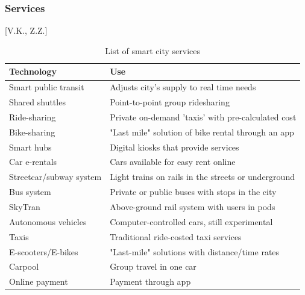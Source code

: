 \documentclass[12pt]{article}                       %
\begin{document}
\subsubsection{Services}[V.K., Z.Z.] \label{sec:smart_city_services}
\begin{table}[H]
    \centering
    \small
    \begin{tabular}{l|l}
        \textbf{Technology} & \textbf{Use} \\
        \hline{}
        
        Smart public transit &
        Adjusts city's supply to real time needs \\
        \hline{}
        
        Shared shuttles &
        Point-to-point group ridesharing \\
        \hline{}
        
        Ride-sharing &
        Private on-demand 'taxis' with pre-calculated cost \\
        \hline{}
        
        Bike-sharing &
        "Last mile" solution of bike rental through an app \\
        \hline{}
        
        Smart hubs &
        Digital kiosks that provide services \\
        \hline{}
        
        Car e-rentals &
        Cars available for easy rent online \\
        \hline{}
        
        Streetcar/subway system &
        Light trains on rails in the streets or underground \\
        \hline{}
        
        Bus system &
        Private or public buses with stops in the city \\
        \hline{}
        
        SkyTran &
        Above-ground rail system with users in pods \\
        \hline{}
        
        Autonomous vehicles &
        Computer-controlled cars, still experimental \\
        \hline{}
        
        Taxis &
        Traditional ride-costed taxi services \\
        \hline{}
        
        E-scooters/E-bikes &
        "Last-mile" solutions with distance/time rates \\
        \hline{}
        
        Carpool &
        Group travel in one car \\
        \hline{}
        
        Online payment &
        Payment through app
    \end{tabular}
    \caption{List of smart city services}
    \label{tab:smart_city_services}
\end{table}
\end{document}
